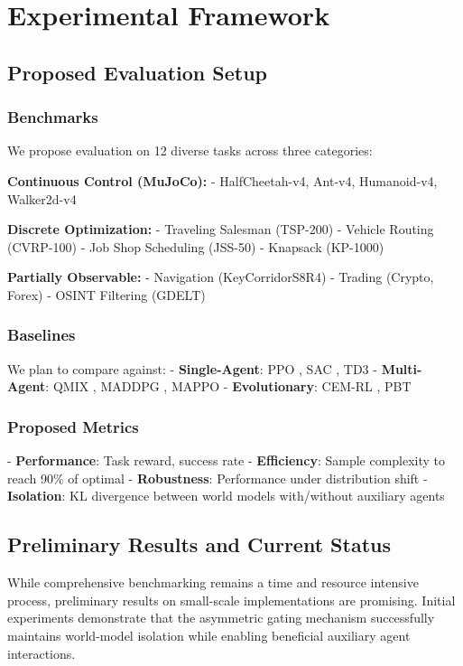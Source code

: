 \documentclass[12pt, a4paper]{article}
\begin{document}
\section{Experimental Framework}

\subsection{Proposed Evaluation Setup}

\subsubsection{Benchmarks}
We propose evaluation on 12 diverse tasks across three categories:

\textbf{Continuous Control (MuJoCo):}
- HalfCheetah-v4, Ant-v4, Humanoid-v4, Walker2d-v4

\textbf{Discrete Optimization:}
- Traveling Salesman (TSP-200)
- Vehicle Routing (CVRP-100)
- Job Shop Scheduling (JSS-50)
- Knapsack (KP-1000)

\textbf{Partially Observable:}
- Navigation (KeyCorridorS8R4)
- Trading (Crypto, Forex)
- OSINT Filtering (GDELT)

\subsubsection{Baselines}
We plan to compare against:
- \textbf{Single-Agent}: PPO \cite{schulman2017proximal}, SAC \cite{haarnoja2018soft}, TD3 \cite{fujimoto2018addressing}
- \textbf{Multi-Agent}: QMIX \cite{rashid2018qmix}, MADDPG \cite{lowe2017multi}, MAPPO \cite{yu2022surprising}
- \textbf{Evolutionary}: CEM-RL \cite{pourchot2018cem}, PBT \cite{jaderberg2017population}

\subsubsection{Proposed Metrics}
- \textbf{Performance}: Task reward, success rate
- \textbf{Efficiency}: Sample complexity to reach 90\% of optimal
- \textbf{Robustness}: Performance under distribution shift
- \textbf{Isolation}: KL divergence between world models with/without auxiliary agents

\subsection{Preliminary Results and Current Status}

While comprehensive benchmarking remains a time and resource intensive process, preliminary results on small-scale implementations are promising. Initial experiments demonstrate that the asymmetric gating mechanism successfully maintains world-model isolation while enabling beneficial auxiliary agent interactions.
\end{document}
